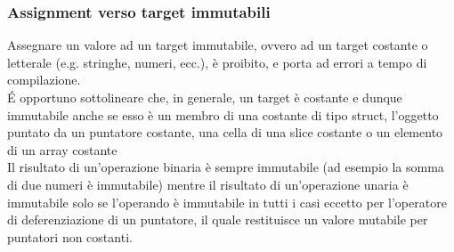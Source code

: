 \subsubsection{Assignment verso target immutabili}
Assegnare un valore ad un target immutabile, ovvero ad un target costante o letterale 
(e.g. stringhe, numeri, ecc.), è proibito, e porta ad errori a tempo di compilazione. \\

É opportuno sottolineare che, in generale, un target è costante e dunque immutabile anche se esso
è un membro di una costante di tipo struct, l'oggetto puntato da un puntatore costante, una cella 
di una slice costante o un elemento di un array costante \\

Il risultato di un'operazione binaria è sempre immutabile (ad esempio la somma di due numeri è immutabile)
mentre il risultato di un'operazione unaria è immutabile solo se l'operando è immutabile in tutti i casi
eccetto per l'operatore di deferenziazione di un puntatore, il quale restituisce un valore mutabile per 
puntatori non costanti. \\